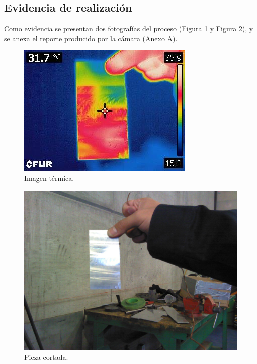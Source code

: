 
\subsection{Evidencia de realizaci\'on}
Como evidencia se presentan dos fotograf\'ias del proceso (Figura 1 y Figura 2), y se anexa el reporte producido
por la c\'amara (Anexo A).

 \begin{figure}[!htbp]
 \centering
 \includegraphics [scale=1]
 {./img/13115323_10208233760737222_581857646_n.jpg}
 \caption{Imagen t\'ermica.}
 \end{figure}

 \begin{figure}[!htbp]
 \centering
 \includegraphics [scale=0.15]
 {./img/13148168_10208233760857225_455642844_o.jpg}
 \caption{Pieza cortada.}
 \end{figure}

 \pagebreak